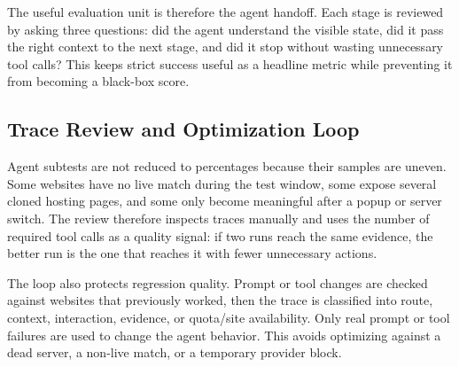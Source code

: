 The useful evaluation unit is therefore the agent handoff. Each stage is reviewed by
asking three questions: did the agent understand the visible state, did it pass the right
context to the next stage, and did it stop without wasting unnecessary tool calls? This
keeps strict success useful as a headline metric while preventing it from becoming a
black-box score.

\subsection{Trace Review and Optimization Loop}

Agent subtests are not reduced to percentages because their samples are uneven. Some
websites have no live match during the test window, some expose several cloned hosting
pages, and some only become meaningful after a popup or server switch. The review
therefore inspects traces manually and uses the number of required tool calls as a
quality signal: if two runs reach the same evidence, the better run is the one that
reaches it with fewer unnecessary actions.



The loop also protects regression quality. Prompt or tool changes are checked against
websites that previously worked, then the trace is classified into route, context,
interaction, evidence, or quota/site availability. Only real prompt or tool failures are
used to change the agent behavior. This avoids optimizing against a dead server, a
non-live match, or a temporary provider block.

